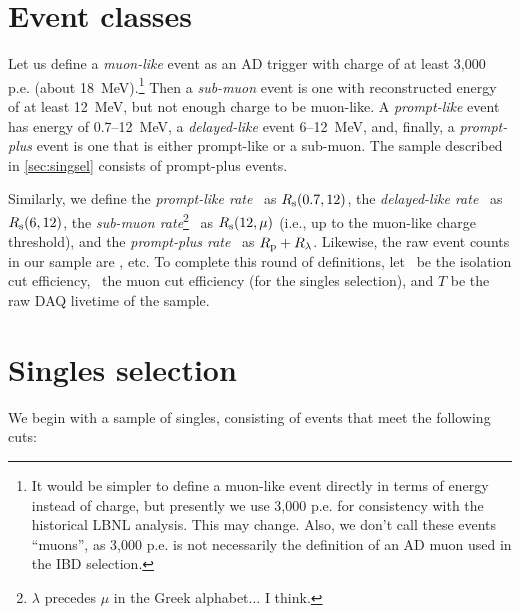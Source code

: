 \documentclass[../thesis.tex]{subfiles}
\begin{document}
\section{Event classes}
\label{sec:accdmcevtcls}

Let us define a \emph{muon-like} event as an AD trigger with charge of at least
3,000 p.e. (about 18~MeV).\footnote{It would be simpler to define a muon-like
  event directly in terms of energy instead of charge, but presently we use
  3,000 p.e. for consistency with the historical LBNL analysis. This may change.
  Also, we don't call these events ``muons'', as 3,000 p.e. is not necessarily
  the definition of an AD muon used in the IBD selection.} Then a
\emph{sub-muon} event is one with reconstructed energy of at least 12~MeV, but
not enough charge to be muon-like. A \emph{prompt-like} event has energy of
0.7--12~MeV, a \emph{delayed-like} event 6--12~MeV, and, finally, a
\emph{prompt-plus} event is one that is either prompt-like or a sub-muon. The
sample described in \autoref{sec:singsel} consists of prompt-plus events.

Similarly, we define the \emph{prompt-like rate} \Rpro\ as $R_\mathrm{s}(0.7, 12)$, the
\emph{delayed-like rate} \Rdel\ as $R_\mathrm{s}(6, 12)$, the \emph{sub-muon
  rate}\footnote{$\lambda$ precedes $\mu$ in the Greek alphabet... I think.}
\Rsub\ as $R_\mathrm{s}(12, \mu)$ (i.e., up to the muon-like charge threshold), and the
\emph{prompt-plus rate} \Rplu\ as $R_\mathrm{p} + R_\mathrm{\lambda}$. Likewise, the raw event
counts in our sample are \Npro, etc. To complete this round of definitions, let
\eisol\ be the isolation cut efficiency, \emu\ the muon cut efficiency (for the
singles selection), and $T$ be the raw DAQ livetime of the sample.

\section{Singles selection}
\label{sec:singsel}

We begin with a sample of singles, consisting of events that meet the following
cuts:

\end{document}

